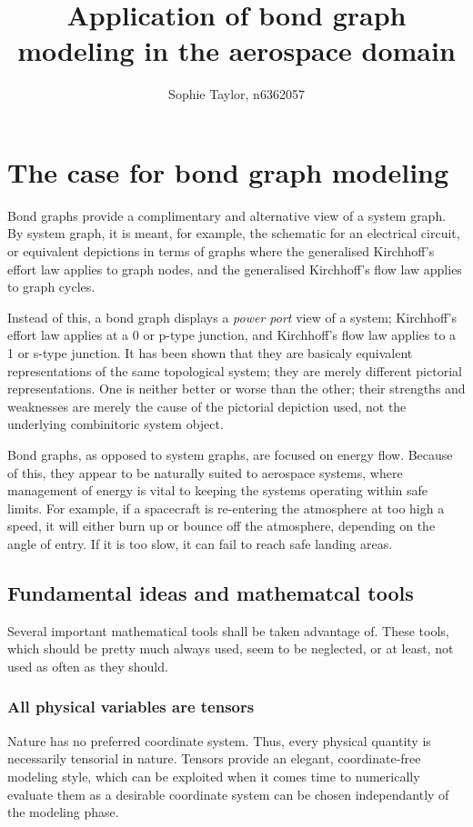 \documentclass[utf,a4paper,12pt]{report}
\title{Application of bond graph modeling in the aerospace domain}
\author{Sophie Taylor, n6362057}
\begin{document}
\maketitle
\tableofcontents

\chapter{The case for bond graph modeling}
Bond graphs provide a complimentary and alternative view of a system graph. By system graph, it is meant, for example, the schematic for an electrical circuit, or equivalent depictions in terms of graphs where the generalised Kirchhoff's effort law applies to graph nodes, and the generalised Kirchhoff's flow law applies to graph cycles.

 Instead of this, a bond graph displays a \emph{power port} view of a system; Kirchhoff's effort law applies at a 0 or p-type junction, and Kirchhoff's flow law applies to a 1 or s-type junction. It has been shown that they are basicaly equivalent representations of the same topological system; they are merely different pictorial representations. One is neither better or worse than the other; their strengths and weaknesses are merely the cause of the pictorial depiction used, not the underlying combinitoric system object.

Bond graphs, as opposed to system graphs, are focused on energy flow. Because of this, they appear to be naturally suited to aerospace systems, where management of energy is vital to keeping the systems operating within safe limits. For example, if a spacecraft is re-entering the atmosphere at too high a speed, it will either burn up or bounce off the atmosphere, depending on the angle of entry. If it is too slow, it can fail to reach safe landing areas.
\section{Fundamental ideas and mathematcal tools}
Several important mathematical tools shall be taken advantage of. These tools, which should be pretty much always used, seem to be neglected, or at least, not used as often as they should.
\subsection{All physical variables are tensors}
Nature has no preferred coordinate system. Thus, every physical quantity is necessarily tensorial in nature. Tensors provide an elegant, coordinate-free modeling style, which can be exploited when it comes time to numerically evaluate them as a desirable coordinate system can be chosen independantly of the modeling phase.
\end{document}
